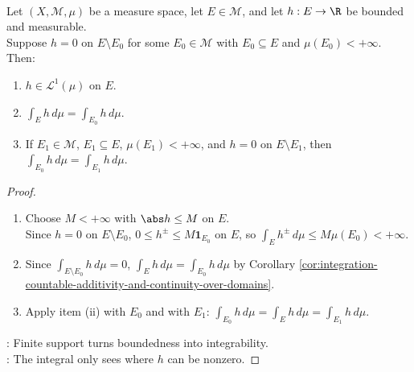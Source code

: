\begin{proposition} \label{prop:finite-measure-support-integrals} \\
Let $(X,\mathcal{M},\mu)$ be a measure space, let $E\in\mathcal{M}$, and let $h:E\to\R$ be bounded and measurable.\\
Suppose $h=0$ on $E\setminus E_0$ for some $E_0\in\mathcal{M}$ with $E_0\subseteq E$ and $\mu(E_0)<+\infty$. Then:
\begin{enumerate}[label=(\roman*)]
\setlength{\itemsep}{0pt}
\item $h\in\mathscr{L}^1(\mu)$ on $E$.
\item $\int_Eh\,d\mu=\int_{E_0}h\,d\mu$.
\item If $E_1\in\mathcal{M}$, $E_1\subseteq E$, $\mu(E_1)<+\infty$, and $h=0$ on $E\setminus E_1$, then $\int_{E_0}h\,d\mu=\int_{E_1}h\,d\mu$.
\end{enumerate}
\begin{proof}
\begin{enumerate}[label=(\roman*)]
\setlength{\itemsep}{0pt}
\item Choose $M<+\infty$ with $\abs h\leq M$ on $E$.\\
Since $h=0$ on $E\setminus E_0$, $0\leq h^\pm\leq M\mathbf{1}_{E_0}$ on $E$, so $\int_Eh^\pm\,d\mu\leq M\mu(E_0)<+\infty$.
\item Since $\int_{E\setminus E_0}h\,d\mu=0$, $\int_Eh\,d\mu=\int_{E_0}h\,d\mu$ by Corollary \ref{cor:integration-countable-additivity-and-continuity-over-domains}.
\item Apply item (ii) with $E_0$ and with $E_1$: $\int_{E_0}h\,d\mu=\int_Eh\,d\mu=\int_{E_1}h\,d\mu$.
\end{enumerate}
: Finite support turns boundedness into integrability.\\
: The integral only sees where $h$ can be nonzero.
\end{proof}
\end{proposition}

